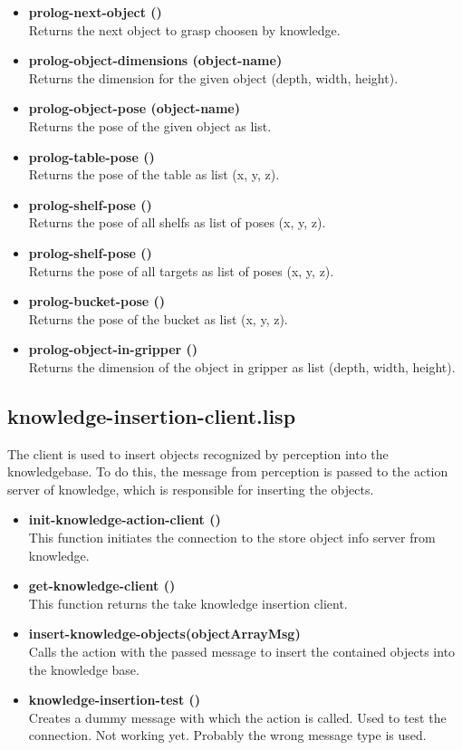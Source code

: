 \documentclass[main.tex]{subfiles}
\begin{document}
\begin{itemize}
				\item \textbf{prolog-next-object ()} \\ Returns the next object to grasp choosen by knowledge.
		    \item \textbf{prolog-object-dimensions (object-name)} \\ Returns the dimension for the given object (depth, width, height).
				\item \textbf{prolog-object-pose (object-name)} \\ Returns the pose of the given object as list.
				\item \textbf{prolog-table-pose ()} \\ Returns the pose of the table as list (x, y, z).
				\item \textbf{prolog-shelf-pose ()} \\ Returns the pose of all shelfs as list of poses (x, y, z).
				\item \textbf{prolog-shelf-pose ()} \\ Returns the pose of all targets as list of poses (x, y, z).
				\item \textbf{prolog-bucket-pose ()} \\ Returns the pose of the bucket as list (x, y, z).
				\item \textbf{prolog-object-in-gripper ()} \\ Returns the dimension of the object in gripper as list (depth, width, height).
			\end{itemize} 
		\subsection{knowledge-insertion-client.lisp}
		\label{knowledge-insertion}
		The client is used to insert objects recognized by perception into the knowledgebase. To do this, the message from perception is passed to the action server of knowledge, which is responsible for inserting the objects.
		\begin{itemize}
		  \item \textbf{init-knowledge-action-client ()} \\
		  This function initiates the connection to the store object info server from knowledge.
		  \item \textbf{get-knowledge-client ()}  \\
		  This function returns the take knowledge insertion client.
		  \item \textbf{insert-knowledge-objects(objectArrayMsg)} \\
		  Calls the action with the passed message to insert the contained objects into the knowledge base.
		  \item \textbf{knowledge-insertion-test ()} \\
		  Creates a dummy message with which the action is called. Used to test the connection. Not working yet. Probably the wrong message type is used.
		\end{itemize}
\end{document}
